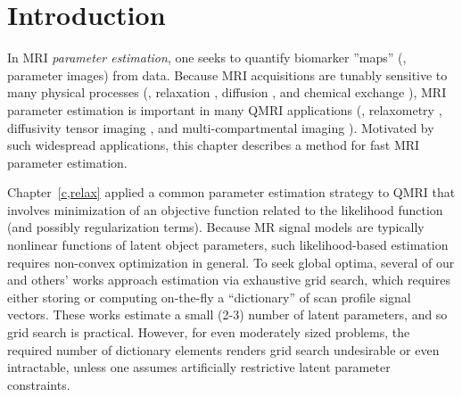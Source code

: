 
\section{Introduction}
\label{s,krr,intro}

In MRI \emph{parameter estimation},
one seeks to quantify biomarker ''maps''
(\ie, parameter images) 
from data.
Because MRI acquisitions 
are tunably sensitive
to many physical processes
(\eg, relaxation \cite{bloch:1946:ni-paper}, 
diffusion \cite{torrey:56:bew}, 
and chemical exchange \cite{mcconnell:58:rrb}),
MRI parameter estimation is important
in many QMRI applications
(\eg, relaxometry \cite{bloembergen:1948:rei}, 
diffusivity tensor imaging \cite{bihan:01:dti}, 
and multi-compartmental imaging \cite{mackay:94:ivv}). 
Motivated by such widespread applications,
this chapter describes a method
for fast MRI parameter estimation.

Chapter~\ref{c,relax} applied
a common parameter estimation strategy
to QMRI
that involves minimization
of an objective function
related to the likelihood function
(and possibly regularization terms).
Because MR signal models are typically nonlinear functions
of latent object parameters,
such likelihood-based estimation
requires non-convex optimization in general.
To seek global optima,
several of our 
\cite{nataraj:14:rje,nataraj:14:mbe,nataraj::oms}
and others' 
\cite{staroswiecki:12:seo,ma:13:mrf,beneliezer:15:raa,zhao:16:mlr}
works approach estimation 
via exhaustive grid search,
which requires either storing
or computing on-the-fly a ``dictionary'' 
of scan profile signal vectors.
These works estimate a small (2-3)
number of latent parameters,
and so grid search is practical.
However, 
for even moderately sized problems,
the required number 
of dictionary elements
renders grid search undesirable or even intractable,
unless one assumes artificially restrictive latent parameter constraints.

